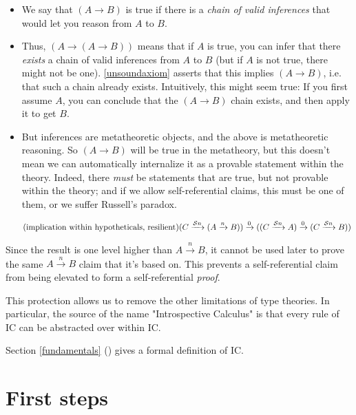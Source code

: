 \documentclass{article}
\begin{document}
  \begin{itemize}
    \item We say that $(A \to B)$ is true if there is a \emph{chain of valid inferences} that would let you reason from $A$ to $B$.
    \item Thus, $(A \to (A \to B))$ means that if $A$ is true, you can infer that there \emph{exists} a chain of valid inferences from $A$ to $B$ (but if $A$ is not true, there might not be one). \eqref{unsoundaxiom} asserts that this implies $(A \to B)$, i.e. that such a chain already exists. Intuitively, this might seem true: If you first assume $A$, you can conclude that the $(A \to B)$ chain exists, and then apply it to get $B$.
    \item But inferences are metatheoretic objects, and the above is metatheoretic reasoning. So $(A \to B)$ will be true in the metatheory, but this doesn't mean we can automatically internalize it as a provable statement within the theory. Indeed, there \emph{must} be statements that are true, but not provable within the theory; and if we allow self-referential claims, this must be one of them, or we suffer Russell's paradox.
  \end{itemize}

  
  
    \renewcommand{\implies}[1]{\xrightarrow{#1}}
  \newcommand{\lzero}{0}
  \newcommand{\lsucc}[1]{\mathcal{S} #1}
  \begin{equation*}
    \tag{implication within hypotheticals, resilient}
    (C \implies{\lsucc n} (A \implies{n} B)) \implies{\lzero} ((C \implies{\lsucc n} A) \implies{\lzero} (C \implies{\lsucc n} B))
    \vspace{0.8em}
  \end{equation*}
  
  Since the result is one level higher than $A \implies{n} B$, it cannot be used later to prove the same $A \implies{n} B$ claim that it's based on. This prevents a self-referential claim from being elevated to form a self-referential \emph{proof}.
  
  This protection allows us to remove the other limitations of type theories.
  In particular, the source of the name "Introspective Calculus" is that every rule of IC can be abstracted over within IC.



  
  Section \ref{fundamentals} (\textit{}) gives a formal definition of IC.   \fi
   
  \section{First steps}\label{firststeps}
  
\end{document}
